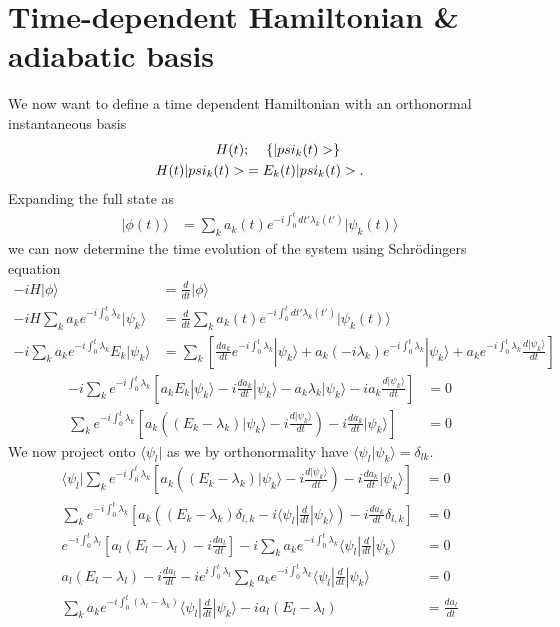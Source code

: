 \section{Time-dependent Hamiltonian \& adiabatic basis}
We now want to define a time dependent Hamiltonian with an orthonormal instantaneous basis
\begin{align}
    H(t)&; \hspace{4mm} \left\{ |\psi_k(t)\rangle \right\} \\
    H(t) |\psi_k(t) \rangle &= E_k(t) |\psi_k(t)\rangle. \\
\end{align}
Expanding the full state as
\begin{align}
    |\phi(t)\rangle &= \sum_k a_k(t) e^{-i\int_0^t dt' \lambda_k(t')}|\psi_k(t)\rangle
\end{align}
we can now determine the time evolution of the system using Schrödingers equation
\begin{align}
    - i H |\phi \rangle &= \frac{d}{dt} |\phi\rangle \\
    -i H \sum_k a_k e^{-i \int_0^t \lambda_k} |\psi_k\rangle&= \frac{d}{dt} \sum_k a_k(t) e^{-i\int_0^t dt' \lambda_k(t')}|\psi_k(t)\rangle\\
    -i\sum_k a_ke^{-i\int_0^t\lambda_k}E_k|\psi_k\rangle &= \sum_k \left[ \frac{d a_k}{dt} e^{- i \int_0^t \lambda_k} |\psi_k \rangle + a_k (-i\lambda_k) e^{-i\int_0^t \lambda_k} |\psi_k\rangle + a_k e^{-i\int_0^t \lambda_k} \frac{d|\psi_k\rangle}{dt} \right] 
\end{align}
\begin{align}
    -i \sum_ke^{-i\int_0^t \lambda_k} \left[ a_k E_k |\psi_k\rangle -i  \frac{d a_k}{dt} |\psi_k \rangle - a_k \lambda_k|\psi_k\rangle -i a_k  \frac{d|\psi_k\rangle}{dt}\right] &= 0 \\
    \sum_ke^{-i\int_0^t \lambda_k} \left[ a_k \left( (E_k - \lambda_k) |\psi_k\rangle - i \frac{d|\psi_k\rangle}{dt}\right) -i  \frac{d a_k}{dt} |\psi_k \rangle \right] &= 0 
\end{align}
We now project onto $\langle \psi_l |$ as we by orthonormality have $\langle \psi_l |\psi_k \rangle = \delta_{lk}$.
\begin{align}
    \langle \psi_l |\sum_k e^{-i\int_0^t \lambda_k} \left[ a_k \left( (E_k - \lambda_k) |\psi_k\rangle - i \frac{d|\psi_k\rangle}{dt}\right) -i  \frac{d a_k}{dt} |\psi_k \rangle \right] &= 0 \\
    \sum_k e^{-i\int_0^t \lambda_k}  \left[a_k \left( ( E_k - \lambda_k) \delta_{l,k}  - i \langle \psi_l | \frac{d}{dt} |\psi_k\rangle \right) - i \frac{d a_k}{dt} \delta_{l,k}   \right] &= 0 \\
    e^{-i\int_0^t \lambda_l} \left[ a_l(E_l - \lambda_l) -  i \frac{d a_l}{dt} \right] - i \sum_k a_k e^{-i\int_0^t \lambda_k}  \langle \psi_l | \frac{d}{dt} |\psi_k\rangle &= 0 \\
    a_l(E_l - \lambda_l) -  i \frac{d a_l}{dt} - i e^{i\int_0^t \lambda_l} \sum_k a_k e^{-i\int_0^t \lambda_k} \langle \psi_l | \frac{d}{dt} |\psi_k\rangle &= 0 \\
    \sum_k a_k e^{-i\int_0^t (\lambda_l - \lambda_k)} \langle \psi_l | \frac{d}{dt} |\psi_k\rangle -i a_l(E_l - \lambda_l) &= \frac{d a_l}{dt} 
\end{align}
